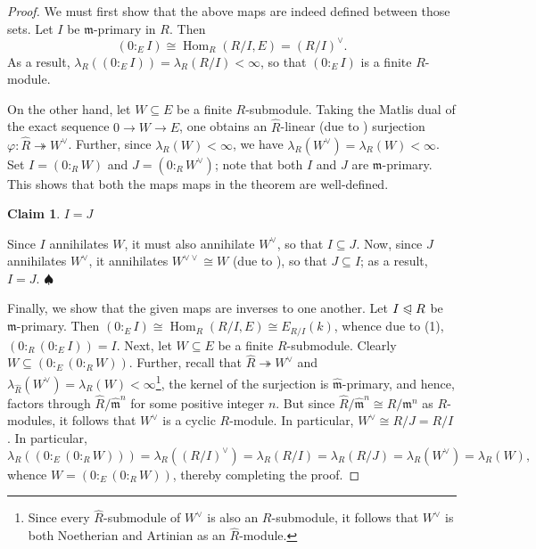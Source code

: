 \documentclass[10pt]{article}
\theoremstyle{thmstyle}
\theoremstyle{defstyle}
\newtheorem*{claim}{Claim}
\newcommand{\Hom}{\operatorname{Hom}}
\newcommand{\frakm}{\mathfrak{m}} %
\newcommand{\wh}[1]{\widehat{#1}}
\newcommand{\onto}{\twoheadrightarrow}
\newcommand{\noreq}{\trianglelefteqslant}
\begin{document}
\begin{proof}
    We must first show that the above maps are indeed defined between those sets. Let $I$ be $\frakm$-primary in $R$. Then 
    \begin{equation*}
        \left(0 :_E I\right)\cong\Hom_R\left(R/I, E\right) = \left(R/I\right)^\vee.
    \end{equation*}
    As a result, $\lambda_R\left(\left(0 :_E I\right)\right) = \lambda_R(R/I) < \infty$, so that $(0:_E I)$ is a finite $R$-module. 

    On the other hand, let $W\subseteq E$ be a finite $R$-submodule. Taking the Matlis dual of the exact sequence $0\to W\to E$, one obtains an $\wh R$-linear (due to ) surjection $\varphi: \wh R\onto W^\vee$. Further, since $\lambda_R(W) < \infty$, we have $\lambda_R(W^\vee) = \lambda_R(W) < \infty$. Set $I = (0:_R W)$ and $J = (0 :_R W^\vee)$; note that both $I$ and $J$ are $\frakm$-primary. This shows that both the maps maps in the theorem are well-defined.
    \begin{claim}
        $I = J$
    \end{claim}
    \noindent Since $I$ annihilates $W$, it must also annihilate $W^\vee$, so that $I\subseteq J$. Now, since $J$ annihilates $W^\vee$, it annihilates $W^{\vee\vee}\cong W$ (due to ), so that $J\subseteq I$; as a result, $I = J$. $\spadesuit$

    Finally, we show that the given maps are inverses to one another. Let $I\noreq R$ be $\frakm$-primary. Then $(0 :_E I)\cong\Hom_R(R/I, E)\cong E_{R/I}(k)$, whence due to  (1), $\left(0:_R\left(0:_E I\right)\right) = I$. Next, let $W\subseteq E$ be a finite $R$-submodule. Clearly $W\subseteq (0:_E (0:_R W))$. Further, recall that $\wh R\onto W^\vee$ and $\lambda_{\wh R}(W^\vee) = \lambda_R(W) < \infty$\footnote{Since every $\wh R$-submodule of $W^\vee$ is also an $R$-submodule, it follows that $W^\vee$ is both Noetherian and Artinian as an $\wh R$-module.}, the kernel of the surjection is $\wh\frakm$-primary, and hence, factors through $\wh R/\wh\frakm^n$ for some positive integer $n$. But since $\wh R/\wh\frakm^n\cong R/\frakm^n$ as $R$-modules, it follows that $W^\vee$ is a cyclic $R$-module. In particular, $W^\vee\cong R/J = R/I$. In particular, 
    \begin{equation*}
        \lambda_R\left(\left(0 :_E\left(0:_R W\right)\right)\right) = \lambda_R\left((R/I)^\vee\right) = \lambda_R(R/I) = \lambda_R(R/J) = \lambda_R(W^\vee) = \lambda_R(W),
    \end{equation*}
    whence $W = \left(0:_E\left(0:_R W\right)\right)$, thereby completing the proof.
\end{proof}
\end{document}
